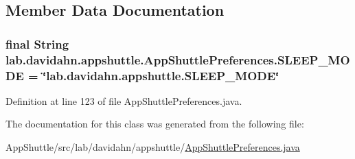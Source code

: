 \subsection{\-Member \-Data \-Documentation}
\hypertarget{classlab_1_1davidahn_1_1appshuttle_1_1_app_shuttle_preferences_a85ae58ace3e52bc643af3d75e0aec424}{
\subsubsection[{\-S\-L\-E\-E\-P\-\_\-\-M\-O\-D\-E}]{\setlength{\rightskip}{0pt plus 5cm}final \-String {\bf lab.\-davidahn.\-appshuttle.\-App\-Shuttle\-Preferences.\-S\-L\-E\-E\-P\-\_\-\-M\-O\-D\-E} = \char`\"{}lab.\-davidahn.\-appshuttle.\-S\-L\-E\-E\-P\-\_\-\-M\-O\-D\-E\char`\"{}}}\label{classlab_1_1davidahn_1_1appshuttle_1_1_app_shuttle_preferences_a85ae58ace3e52bc643af3d75e0aec424}


\-Definition at line 123 of file \-App\-Shuttle\-Preferences.\-java.



\-The documentation for this class was generated from the following file\-:\begin{DoxyCompactItemize}
\item 
\-App\-Shuttle/src/lab/davidahn/appshuttle/\hyperlink{_app_shuttle_preferences_8java}{\-App\-Shuttle\-Preferences.\-java}\end{DoxyCompactItemize}
